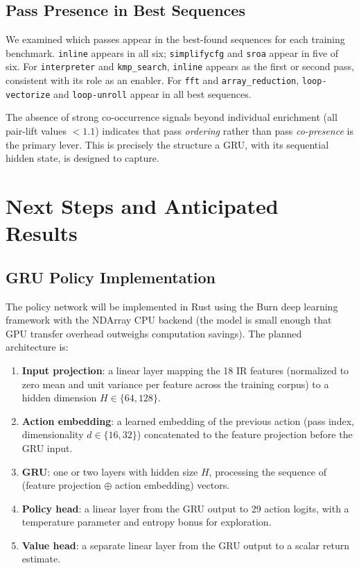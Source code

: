 \documentclass[conference]{IEEEtran}
\begin{document}
\subsection{Pass Presence in Best Sequences}

We examined which passes appear in the best-found sequences for each training
benchmark.  \texttt{inline} appears in all six; \texttt{simplifycfg} and
\texttt{sroa} appear in five of six.  For \texttt{interpreter} and
\texttt{kmp\_search}, \texttt{inline} appears as the first or second pass,
consistent with its role as an enabler.  For \texttt{fft} and
\texttt{array\_reduction}, \texttt{loop-vectorize} and \texttt{loop-unroll}
appear in all best sequences.

The absence of strong co-occurrence signals beyond individual enrichment (all
pair-lift values $< 1.1$) indicates that pass \emph{ordering} rather than pass
\emph{co-presence} is the primary lever.  This is precisely the structure a
GRU, with its sequential hidden state, is designed to capture.

\section{Next Steps and Anticipated Results}

\subsection{GRU Policy Implementation}

The policy network will be implemented in Rust using the Burn deep learning
framework with the NDArray CPU backend (the model is small enough that GPU
transfer overhead outweighs computation savings).  The planned architecture is:

\begin{enumerate}
  \item \textbf{Input projection}: a linear layer mapping the 18 IR features
        (normalized to zero mean and unit variance per feature across the
        training corpus) to a hidden dimension $H \in \{64, 128\}$.
  \item \textbf{Action embedding}: a learned embedding of the previous action
        (pass index, dimensionality $d \in \{16, 32\}$) concatenated to the
        feature projection before the GRU input.
  \item \textbf{GRU}: one or two layers with hidden size $H$, processing the
        sequence of (feature projection $\oplus$ action embedding) vectors.
  \item \textbf{Policy head}: a linear layer from the GRU output to 29 action
        logits, with a temperature parameter and entropy bonus for exploration.
  \item \textbf{Value head}: a separate linear layer from the GRU output to a
        scalar return estimate.
\end{enumerate}
\end{document}
